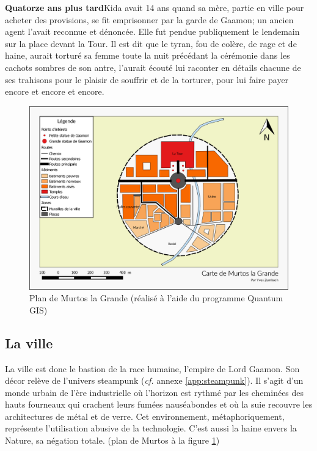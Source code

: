 \textbf{Quatorze ans plus tard}\quad Kida avait 14 ans quand sa mère, partie en ville pour acheter des provisions, se fit emprisonner par la garde de Gaamon; un ancien agent l'avait reconnue et dénoncée. Elle fut pendue publiquement le lendemain sur la place devant la Tour. Il est dit que le tyran, fou de colère, de rage et de haine, aurait torturé sa femme toute la nuit précédant la cérémonie dans les cachots sombres de son antre, l'aurait écouté lui raconter en détails chacune de ses trahisons pour le plaisir de souffrir et de la torturer, pour lui faire payer encore et encore et encore.



\begin{figure}[ht]
	\hspace*{-2cm}\includegraphics[width=\textwidth+2cm]{images/Monde/carteVille.png}
	\caption{Plan de Murtos la Grande (réalisé à l'aide du programme Quantum GIS)}
	\label{fig:murtosLaGrande}
\end{figure}

\subsection{La ville}
La ville est donc le bastion de la race humaine, l'empire de Lord Gaamon. Son décor relève de l'univers steampunk (\textit{cf.} annexe \ref{app:steampunk}). Il s'agit d'un monde urbain de l'ère industrielle où l'horizon est rythmé par les cheminées des hauts fourneaux qui crachent leurs fumées nauséabondes et où la suie recouvre les architectures de métal et de verre. Cet environnement, métaphoriquement, représente l'utilisation abusive de la technologie. C'est aussi la haine envers la Nature, sa négation totale. (plan de Murtos à la figure \ref{fig:murtosLaGrande})

